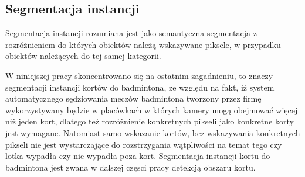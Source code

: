 \subsection*{Segmentacja instancji}
Segmentacja instancji rozumiana jest jako semantyczna segmentacja z rozróżnieniem do których obiektów należą wskazywane piksele, w przypadku obiektów należących do tej samej kategorii.

W niniejszej pracy skoncentrowano się na ostatnim zagadnieniu,  to znaczy segmentacji instancji kortów do badmintona, ze względu na fakt, iż system automatycznego sędziowania meczów badmintona tworzony przez firmę \blue{} wykorzystywany będzie w placówkach w których kamery mogą obejmować więcej niż jeden kort, dlatego też rozróżnienie konkretnych pikseli jako konkretne korty jest wymagane. Natomiast samo wskazanie kortów, bez wskazywania konkretnych pikseli nie jest wystarczające do rozstrzygania wątpliwości na temat tego czy lotka wypadła czy nie wypadła poza kort. Segmentacja instancji kortu do badmintona jest zwana w dalszej częsci pracy detekcją obszaru kortu.
